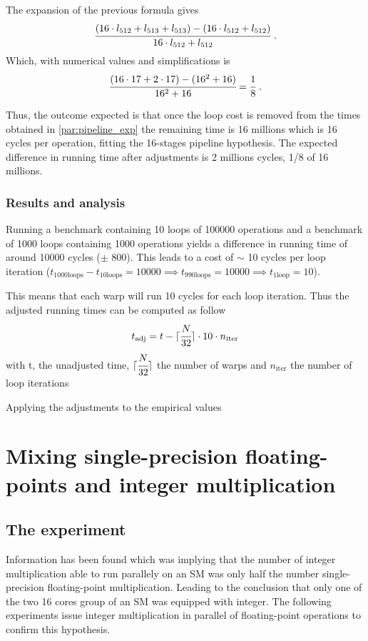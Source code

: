 \documentclass{article}
\DeclarePairedDelimiter\ceil{\lceil}{\rceil}
\begin{document}
    The expansion of the previous formula gives
    \[ \cfrac{(16\cdot l_{512} + l_{513} + l_{513}) - (16\cdot l_{512} + l_{512})}{16\cdot l_{512} + l_{512}} \text{  .}\]
    Which, with numerical values and simplifications is
    \[ \cfrac{(16\cdot 17 + 2\cdot 17) - (16^2 + 16)}{16^2 + 16} = \cfrac{1}{8}\text{  .}\] 

    Thus, the outcome expected is that once the loop cost is removed from the 
    times obtained in \ref{par:pipeline_exp} the remaining time is 16 millions
    which is 16 cycles per operation, fitting the 16-stages pipeline hypothesis.
    The expected difference in running time after adjustments is 2 millions cycles,
    1/8 of 16 millions.

	\subsubsection{Results and analysis}
    Running a benchmark containing 10 loops of 100000 operations and a benchmark
    of 1000 loops containing 1000 operations yields a difference in running time of
    around 10000 cycles ($\pm$ 800). This leads to a cost of $\sim$ 10 cycles per
    loop iteration ($t_{\text{1000loops}} - t_{\text{10loops}} = 10000 \implies t_{\text{990loops}} = 10000 \implies t_{\text{1loop}} = 10$).
    
	This means that each warp will run 10 cycles for each loop iteration. Thus the 
    adjusted running times can be computed as follow
    \[ t_{\text{adj}} = t - \ceil{\cfrac{N}{32}}\cdot 10 \cdot n_{\text{iter}} \]
    with t, the unadjusted time, $\ceil{\cfrac{N}{32}}$ the number of warps and 
    $n_{\text{iter}}$ the number of loop iterations

    Applying the adjustments to the empirical values %

\section{Mixing single-precision floating-points and integer multiplication}
	\subsection{The experiment}
	Information has been found which was implying that the number of integer multiplication
    able to run parallely on an SM was only half the number single-precision floating-point
    multiplication. Leading to the conclusion that only one of the two 16 cores group of an
    SM was equipped with integer. The following experiments issue integer multiplication in
    parallel of floating-point operations to confirm this hypothesis.
\end{document}
